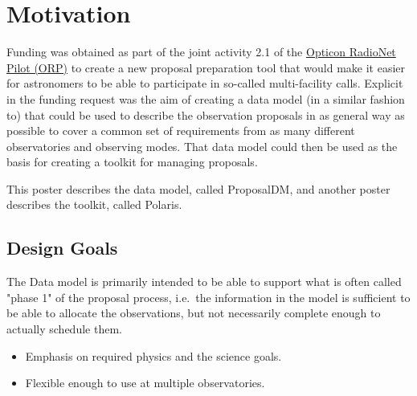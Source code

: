 \documentclass[11pt,twoside]{article}
\begin{document}



\section{Motivation}
        Funding was obtained as part of the joint activity 2.1 of the \href{https://www.orp-h2020.eu}{Opticon RadioNet Pilot (ORP)} to create
        a new proposal preparation tool that would make it easier for astronomers to be able to participate in so-called
        multi-facility calls.
        Explicit in the funding request was the aim of creating a data model (in a similar fashion to\cite{10.1117/12.789262}) that could be used to describe the observation proposals
        in as general way as possible to cover a common set of requirements from as many different observatories and observing modes.
        That data model could  then be used as the basis for creating a toolkit for managing proposals.

        This poster describes the data model, called ProposalDM, and another poster \citep{p103_adassxxxiv} describes the toolkit, called Polaris.


        \subsection{Design Goals}
        The Data model is primarily intended to be able to support what is often called "phase 1" of the proposal process, i.e.\ the information
        in the model is sufficient to be able to allocate the observations, but not necessarily complete enough to actually schedule them.
        \begin{itemize}
            \item Emphasis on required physics and the science goals.
            \item Flexible enough to use at multiple observatories.
        \end{itemize}
\end{document}
